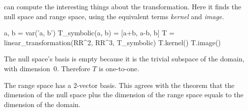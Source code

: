 \Sage{} can compute the interesting things about the transformation.
Here it finds the null space 
and range space, using the equivalent 
terms \textit{kernel} and \textit{image}.
\begin{sageoutput}[d,0,3;s,4,70,59;s,8,70,59]
a, b = var('a, b')   
T_symbolic(a, b) = [a+b, a-b, b]         
T = linear_transformation(RR^2, RR^3, T_symbolic)
T.kernel()                                       
T.image()                                        
\end{sageoutput}
The null space's basis is empty because 
it is the trivial subspace of the domain,
with dimension~$0$.
Therefore $T$ is one-to-one.

The range space has a $2$-vector basis. 
This agrees with the theorem that
the dimension of the null space plus the dimension of the 
range space equals to the dimension of the domain.


